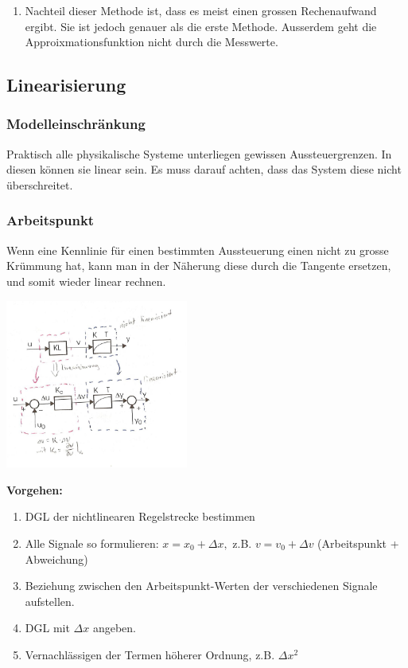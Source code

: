 \begin{enumerate}[start=2]
\begin{enumerate}
\begin{enumerate}
								\item	Nachteil dieser Methode ist, dass es meist einen grossen
											Rechenaufwand ergibt. Sie ist jedoch genauer als die erste Methode.
											Ausserdem geht die Approixmationsfunktion nicht durch die Messwerte.
           		\end{enumerate}
		\end{enumerate}
	\end{enumerate}
    
	 
	
	\subsection{Linearisierung}
		\subsubsection{Modelleinschränkung}
			Praktisch alle physikalische Systeme unterliegen gewissen Aussteuergrenzen.
			In diesen können sie linear sein. Es muss darauf achten, dass  das System
			diese nicht überschreitet.
			
		\subsubsection{Arbeitspunkt}
			\begin{minipage}{9cm}
				Wenn eine Kennlinie für einen bestimmten Aussteuerung einen nicht zu grosse
				Krümmung hat, kann man in der Näherung diese durch die Tangente ersetzen, und
				somit wieder linear rechnen.
			\end{minipage}
			\hspace{0.5cm}
			\begin{minipage}{8cm}
				\includegraphics[width=6cm]{./bilder/LinearisierungImAP.png}
			\end{minipage}
			
			\textbf{Vorgehen:}\\
			\begin{enumerate}
				\item DGL der nichtlinearen Regelstrecke bestimmen
				\item Alle Signale so formulieren: $x = x_0 + \Delta x,$ z.B. $v=v_0 + \Delta v$ (Arbeitspunkt + Abweichung)
				\item Beziehung zwischen den Arbeitspunkt-Werten der verschiedenen Signale aufstellen.
				\item DGL mit $\Delta x$ angeben.
				\item Vernachlässigen der Termen höherer Ordnung, z.B. $\Delta x^2$
			\end{enumerate}
			
